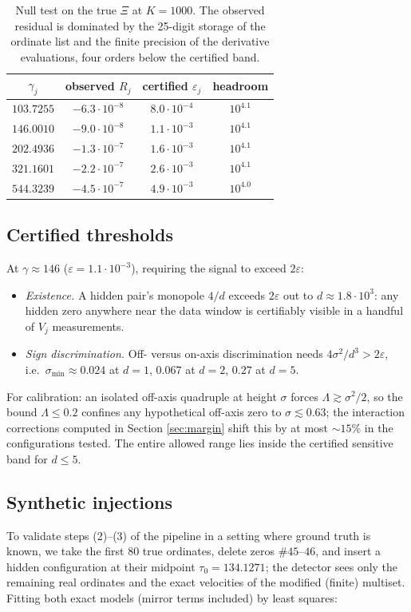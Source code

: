 \documentclass[11pt]{amsart}
\theoremstyle{remark}
\begin{document}
\begin{table}[ht]
\centering
\begin{tabular}{cccc}
\toprule
$\gamma_j$ & observed $R_j$ & certified $\varepsilon_j$ & headroom \\
\midrule
$103.7255$ & $-6.3\cdot 10^{-8}$ & $8.0\cdot 10^{-4}$ & $10^{4.1}$\\
$146.0010$ & $-9.0\cdot 10^{-8}$ & $1.1\cdot 10^{-3}$ & $10^{4.1}$\\
$202.4936$ & $-1.3\cdot 10^{-7}$ & $1.6\cdot 10^{-3}$ & $10^{4.1}$\\
$321.1601$ & $-2.2\cdot 10^{-7}$ & $2.6\cdot 10^{-3}$ & $10^{4.1}$\\
$544.3239$ & $-4.5\cdot 10^{-7}$ & $4.9\cdot 10^{-3}$ & $10^{4.0}$\\
\bottomrule
\end{tabular}
\medskip
\caption{Null test on the true $\Xi$ at $K=1000$. The observed residual is dominated by the 25-digit storage of the ordinate list and the finite precision of the derivative evaluations, four orders below the certified band.}
\label{tab:null}
\end{table}

\subsection{Certified thresholds}\label{sec:thresholds}
At $\gamma\approx 146$ ($\varepsilon=1.1\cdot 10^{-3}$), requiring the signal to exceed $2\varepsilon$:
\begin{itemize}
\item \emph{Existence.} A hidden pair's monopole $4/d$ exceeds $2\varepsilon$ out to $d\approx 1.8\cdot 10^{3}$: any hidden zero anywhere near the data window is certifiably visible in a handful of $V_j$ measurements.
\item \emph{Sign discrimination.} Off- versus on-axis discrimination needs $4\sigma^2/d^3>2\varepsilon$, i.e.\ $\sigma_{\min}\approx 0.024$ at $d=1$, $0.067$ at $d=2$, $0.27$ at $d=5$.
\end{itemize}
For calibration: an isolated off-axis quadruple at height $\sigma$ forces $\Lambda\gtrsim\sigma^2/2$, so the bound $\Lambda\le 0.2$ \cite{Polymath15,PT} confines any hypothetical off-axis zero to $\sigma\lesssim 0.63$; the interaction corrections computed in Section \ref{sec:margin} shift this by at most $\sim\!15\%$ in the configurations tested. The entire allowed range lies inside the certified sensitive band for $d\le 5$.

\subsection{Synthetic injections}\label{sec:synthetic}
To validate steps (2)--(3) of the pipeline in a setting where ground truth is known, we take the first $80$ true ordinates, delete zeros $\#45$--$46$, and insert a hidden configuration at their midpoint $\tau_0=134.1271$; the detector sees only the remaining real ordinates and the exact velocities of the modified (finite) multiset. Fitting both exact models (mirror terms included) by least squares:
\end{document}
